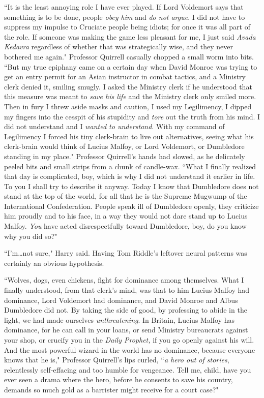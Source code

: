 ``It is the least annoying role I have ever played. If Lord Voldemort says that something is to be done, people \emph{obey him} and \emph{do not argue}. I did not have to suppress my impulse to Cruciate people being idiots; for once it was all part of the role. If someone was making the game less pleasant for me, I just said \emph{Avada Kedavra} regardless of whether that was strategically wise, and they never bothered me again." Professor Quirrell casually chopped a small worm into bits. ``But my true epiphany came on a certain day when David Monroe was trying to get an entry permit for an Asian instructor in combat tactics, and a Ministry clerk denied it, smiling smugly. I asked the Ministry clerk if he understood that this measure was meant to \emph{save his life} and the Ministry clerk only smiled more. Then in fury I threw aside masks and caution, I used my Legilimency, I dipped my fingers into the cesspit of his stupidity and \emph{tore} out the truth from his mind. I did not understand and I \emph{wanted to understand}. With my command of Legilimency I forced his tiny clerk-brain to live out alternatives, seeing what his clerk-brain would think of Lucius Malfoy, or Lord Voldemort, or Dumbledore standing in my place." Professor Quirrell's hands had slowed, as he delicately peeled bits and small strips from a chunk of candle-wax. ``What I finally realized that day is complicated, boy, which is why I did not understand it earlier in life. To you I shall try to describe it anyway. Today I know that Dumbledore does not stand at the top of the world, for all that he is the Supreme Mugwump of the International Confederation. People speak ill of Dumbledore openly, they criticize him proudly and to his face, in a way they would not dare stand up to Lucius Malfoy. \emph{You} have acted disrespectfully toward Dumbledore, boy, do you know why you did so?"

``I'm…not sure," Harry said. Having Tom Riddle's leftover neural patterns was certainly an obvious hypothesis.

``Wolves, dogs, even chickens, fight for dominance among themselves. What I finally understood, from that clerk's mind, was that to him Lucius Malfoy had dominance, Lord Voldemort had dominance, and David Monroe and Albus Dumbledore did not. By taking the side of good, by professing to abide in the light, we had made ourselves \emph{unthreatening}. In Britain, Lucius Malfoy has dominance, for he can call in your loans, or send Ministry bureaucrats against your shop, or crucify you in the \emph{Daily Prophet,} if you go openly against his will. And the most powerful wizard in the world has no dominance, because everyone knows that he is," Professor Quirrell's lips curled, ``\emph{a hero out of stories}, relentlessly self-effacing and too humble for vengeance. Tell me, child, have you ever seen a drama where the hero, before he consents to save his country, demands so much gold as a barrister might receive for a court case?"


